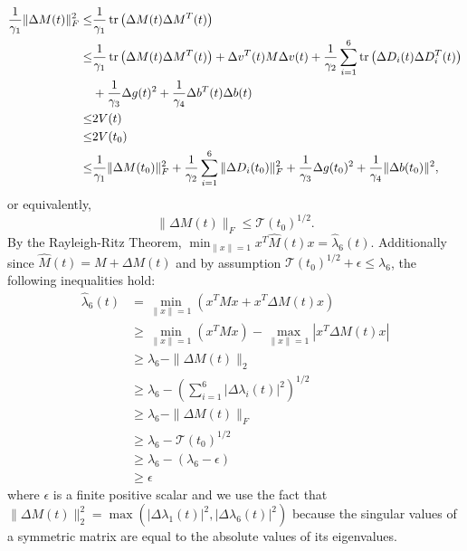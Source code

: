 \begin{align}
\frac{1}{\gamma_1}\|\Delta M(t)\|_F^2
  \leq&\frac{1}{\gamma_1}\operatorname{tr}\left(\Delta M(t) \Delta M^T(t)\right)
\nonumber \\
  \leq&\frac{1}{\gamma_1}\operatorname{tr}\left(\Delta M(t) \Delta M^T(t)\right) + \Delta v^T(t) M \Delta v (t)
       +\frac{1}{\gamma_2}\sum_{i=1}^6\operatorname{tr}\left(\Delta D_i(t) \Delta D_i^{T}(t)\right)
\nonumber \\
      & +\frac{1}{\gamma_3}\Delta g(t)^2    
       +\frac{1}{\gamma_4}\Delta b^T(t) \Delta b(t) 
\nonumber \\
   \leq&2 V(t)
\nonumber \\
   \leq&2 V(t_0)
\nonumber \\
   \leq&\frac{1}{\gamma_1}\|\Delta M(t_0)\|_F^2 +
        \frac{1}{\gamma_2}\sum_{i=1}^6 \|\Delta D_i(t_0)\|_F^2 + 
       \frac{1}{\gamma_3}\Delta g(t_0)^2+ \frac{1}{\gamma_4}\|\Delta b(t_0)\|^2,
\end{align}
%
or equivalently, 
%
\begin{equation}
\|\Delta M(t)\|_F\leq\mathcal{T}(t_0)^{1/2}.
\end{equation}
%
By the Rayleigh-Ritz Theorem, $\min_{\|x\|=1}
x^T \hat{M}(t) x=\hat{\lambda}_6(t)$.  Additionally since
$\hat{M}(t)=M+\Delta M(t)$ and by assumption
$\mathcal{T}(t_0)^{1/2}+\epsilon\leq \lambda_6$, the following
inequalities hold:
%
\begin{align}
\hat{\lambda}_6(t)
 &= \min_{\|x\|=1}\left(x^T M x + x^T \Delta M(t) x\right)
\nonumber \\
 &\geq\min_{\|x\|=1}\left(x^T M x\right)-\max_{\|x\|=1}|x^T\Delta M(t)x|
\nonumber \\
 &\geq\lambda_6-\|\Delta M(t)\|_2
\nonumber \\
 &\geq\lambda_6-\left(\sum_{i=1}^6|\Delta\lambda_i(t)|^2\right)^{1/2}
\nonumber \\
 &\geq\lambda_6-\|\Delta M(t)\|_F
\nonumber \\
 &\geq\lambda_6-\mathcal{T}(t_0)^{1/2}
\nonumber \\
 &\geq\lambda_6-\left(\lambda_6-\epsilon\right)
\nonumber \\
 &\geq\epsilon
\end{align}
%
where $\epsilon$ is a finite positive scalar and we use the fact that
$\|\Delta M(t)\|_2^2=\max(|\Delta \lambda_1(t)|^2,|\Delta
\lambda_6(t)|^2)$ because the singular values of a symmetric matrix
are equal to the absolute values of its eigenvalues.
